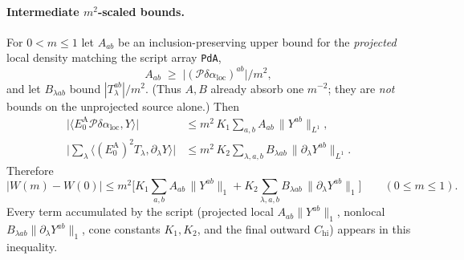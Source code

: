 \paragraph{Intermediate $m^2$-scaled bounds.}
For $0<m\le1$ let $A_{ab}$ be an inclusion-preserving upper bound for the
\emph{projected} local density matching the script array \texttt{PdA},
\[
A_{ab}
\;\ge\;
\bigl|(\mathcal P\delta\alpha_{\mathrm{loc}})^{ab}\bigr|/m^2,
\]
and let $B_{\lambda ab}$ bound $|T_\lambda^{ab}|/m^2$. (Thus $A,B$ already absorb
one $m^{-2}$; they are \emph{not} bounds on the unprojected source alone.)
Then
\begin{align*}
\bigl|\langle E_0^{\mathrm A}\mathcal P\delta\alpha_{\mathrm{loc}},Y\rangle\bigr|
&\le
m^2\,K_1\sum_{a,b}A_{ab}\,\|Y^{ab}\|_{L^1},
\\
\biggl|\sum_\lambda\langle(E_0^{\mathrm A})^2 T_\lambda,\partial_\lambda Y\rangle\biggr|
&\le
m^2\,K_2\sum_{\lambda,a,b}B_{\lambda ab}\,\|\partial_\lambda Y^{ab}\|_{L^1}.
\end{align*}
Therefore
\[
|W(m)-W(0)|
\le
m^2\Biggl[
K_1\sum_{a,b}A_{ab}\,\|Y^{ab}\|_1
+
K_2\sum_{\lambda,a,b}B_{\lambda ab}\,\|\partial_\lambda Y^{ab}\|_1
\Biggr]
\qquad(0\le m\le1).
\]
Every term accumulated by the script (projected local $A_{ab}\|Y^{ab}\|_1$,
nonlocal $B_{\lambda ab}\|\partial_\lambda Y^{ab}\|_1$, cone constants $K_1,K_2$,
and the final outward $C_{\mathrm{hi}}$) appears in this inequality.
